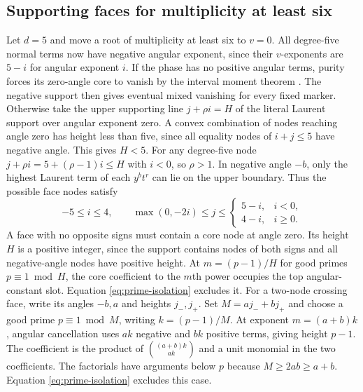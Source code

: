 \subsection{Supporting faces for multiplicity at least six}\label{sec:face-support}

Let \(d=5\) and move a root of multiplicity at least six to \(v=0\).
All degree-five normal terms now have negative angular exponent, since
their \(v\)-exponents are \(5-i\) for angular exponent \(i\). If the phase
has no positive angular terms, purity forces its zero-angle core to
vanish by the interval moment theorem \cite[Theorem 2.1]{muger-tuset}.
The negative support then gives eventual mixed vanishing for every fixed
marker. Otherwise take the upper supporting line \(j+\rho i=H\) of the
literal Laurent support over angular exponent zero. A convex combination
of nodes reaching angle zero has height less than five, since all
equality nodes of \(i+j\le5\) have negative angle. This gives \(H<5\).
For any degree-five node \(j+\rho i=5+(\rho-1)i\le H\) with \(i<0\),
so \(\rho>1\). In negative angle \(-b\), only the highest Laurent term
of each \(y^b t^r\) can lie on the upper boundary. Thus the possible face
nodes satisfy
\[
 -5\le i\le4,\qquad \max(0,-2i)\le j\le
 \begin{cases}5-i,&i<0,\\4-i,&i\ge0.\end{cases}
\]
A face with no opposite signs must contain a core node at angle zero.
Its height \(H\) is a positive integer, since the support contains nodes
of both signs and all negative-angle nodes have positive height.
At \(m=(p-1)/H\) for good primes \(p\equiv1\bmod H\), the core coefficient
to the \(m\)th power occupies the top angular-constant slot. Equation
\eqref{eq:prime-isolation} excludes it. For a two-node crossing face, write its
angles \(-b,a\) and heights \(j_-,j_+\). Set \(M=aj_-+bj_+\) and choose
a good prime \(p\equiv1\bmod M\), writing \(k=(p-1)/M\).
At exponent \(m=(a+b)k\), angular cancellation uses \(ak\) negative and
\(bk\) positive terms, giving height \(p-1\). The coefficient is the
product of \(\binom{(a+b)k}{ak}\) and a unit monomial in the two
coefficients. The factorials have arguments below \(p\) because
\(M\ge2ab\ge a+b\). Equation \eqref{eq:prime-isolation} excludes this case.

